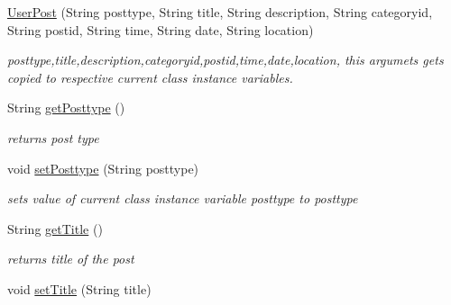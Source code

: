 \begin{DoxyCompactItemize}
\item 
\hyperlink{classcom_1_1example_1_1sel_1_1lostfound_1_1UserPost_ad0a1545afc07c0bd11ee2e009c035931}{User\+Post} (String posttype, String title, String description, String categoryid, String postid, String time, String date, String location)
\begin{DoxyCompactList}\small\item\em posttype,title,description,categoryid,postid,time,date,location, this argumets gets copied to respective current class instance variables. \end{DoxyCompactList}\item 
String \hyperlink{classcom_1_1example_1_1sel_1_1lostfound_1_1UserPost_a8605b0fbdf58cd6805f0aaa0951da641}{get\+Posttype} ()\hypertarget{classcom_1_1example_1_1sel_1_1lostfound_1_1UserPost_a8605b0fbdf58cd6805f0aaa0951da641}{}\label{classcom_1_1example_1_1sel_1_1lostfound_1_1UserPost_a8605b0fbdf58cd6805f0aaa0951da641}

\begin{DoxyCompactList}\small\item\em returns post type \end{DoxyCompactList}\item 
void \hyperlink{classcom_1_1example_1_1sel_1_1lostfound_1_1UserPost_ad504c587f64281c1a47cc29ebb79a359}{set\+Posttype} (String posttype)\hypertarget{classcom_1_1example_1_1sel_1_1lostfound_1_1UserPost_ad504c587f64281c1a47cc29ebb79a359}{}\label{classcom_1_1example_1_1sel_1_1lostfound_1_1UserPost_ad504c587f64281c1a47cc29ebb79a359}

\begin{DoxyCompactList}\small\item\em sets value of current class instance variable posttype to posttype \end{DoxyCompactList}\item 
String \hyperlink{classcom_1_1example_1_1sel_1_1lostfound_1_1UserPost_a0d1d9e880acbaa4cfcc43dd22e215ec8}{get\+Title} ()\hypertarget{classcom_1_1example_1_1sel_1_1lostfound_1_1UserPost_a0d1d9e880acbaa4cfcc43dd22e215ec8}{}\label{classcom_1_1example_1_1sel_1_1lostfound_1_1UserPost_a0d1d9e880acbaa4cfcc43dd22e215ec8}

\begin{DoxyCompactList}\small\item\em returns title of the post \end{DoxyCompactList}\item 
void \hyperlink{classcom_1_1example_1_1sel_1_1lostfound_1_1UserPost_a97ad31f4a915d4ca9611f2b781e60f96}{set\+Title} (String title)\hypertarget{classcom_1_1example_1_1sel_1_1lostfound_1_1UserPost_a97ad31f4a915d4ca9611f2b781e60f96}{}\label{classcom_1_1example_1_1sel_1_1lostfound_1_1UserPost_a97ad31f4a915d4ca9611f2b781e60f96}


\end{DoxyCompactItemize}
